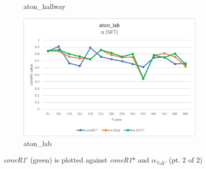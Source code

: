 \begin{appendices}
\begin{figure}
\begin{subfigure}{.45\linewidth}
  \caption{aton\_hallway}
\end{subfigure}
\hfill
\begin{subfigure}{.45\linewidth}
  \includegraphics[width=1\linewidth]{figures/appendix/lab_sift.jpg}
  \caption{aton\_lab}
\end{subfigure}
\caption{\textit{coneR1}$'$ (green) is plotted against \textit{coneR1}* and $\alpha_{\%\Delta}$. (pt. 2 of 2)}

\end{figure}

\clearpage
\FloatBarrier
\begin{figure}


\end{figure}
\end{appendices}
